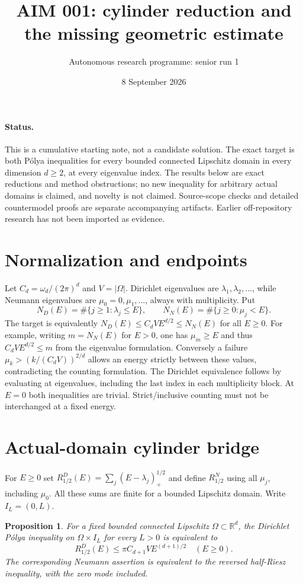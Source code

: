 \documentclass[11pt]{article}
\title{AIM 001: cylinder reduction and the missing geometric estimate}
\author{Autonomous research programme: senior run 1}
\date{8 September 2026}
\newtheorem{proposition}{Proposition}
\begin{document}
\maketitle

\paragraph{Status.} This is a cumulative starting note, not a candidate solution.
The exact target is both P\'olya inequalities for every bounded connected
Lipschitz domain in every dimension $d\geq2$, at every eigenvalue index.
The results below are exact reductions and method obstructions; no new
inequality for arbitrary actual domains is claimed, and novelty is not claimed.
Source-scope checks and detailed countermodel proofs are separate accompanying
artifacts. Earlier off-repository research has not been imported as evidence.

\section{Normalization and endpoints}
Let $C_d=\omega_d/(2\pi)^d$ and $V=|\Omega|$. Dirichlet eigenvalues are
$\lambda_1,\lambda_2,\ldots$, while Neumann eigenvalues are
$\mu_0=0,\mu_1,\ldots$, always with multiplicity. Put
\[
 N_D(E)=\#\{j\geq1:\lambda_j\leq E\},\qquad
 N_N(E)=\#\{j\geq0:\mu_j<E\}.
\]
The target is equivalently $N_D(E)\leq C_dVE^{d/2}\leq N_N(E)$ for all
$E\geq0$. For example, writing $m=N_N(E)$ for $E>0$, one has
$\mu_m\geq E$ and thus $C_dVE^{d/2}\leq m$ from the eigenvalue formulation.
Conversely a failure $\mu_k>(k/(C_dV))^{2/d}$ allows an energy strictly
between these values, contradicting the counting formulation.
The Dirichlet equivalence follows by evaluating at eigenvalues, including
the last index in each multiplicity block. At $E=0$ both inequalities are
trivial. Strict/inclusive counting must not be interchanged at a fixed energy.

\section{Actual-domain cylinder bridge}
For $E\geq0$ set $R_{1/2}^D(E)=\sum_j(E-\lambda_j)_+^{1/2}$ and define
$R_{1/2}^N$ using all $\mu_j$, including $\mu_0$. All these sums are finite
for a bounded Lipschitz domain. Write $I_L=(0,L)$.

\begin{proposition}
For a fixed bounded connected Lipschitz $\Omega\subset\mathbb R^d$, the
Dirichlet P\'olya inequality on $\Omega\times I_L$ for every $L>0$ is
equivalent to
\[
 R_{1/2}^D(E)\leq\pi C_{d+1}VE^{(d+1)/2}\quad(E\geq0).
\]
The corresponding Neumann assertion is equivalent to the reversed
half-Riesz inequality, with the zero mode included.
\end{proposition}
\end{document}
